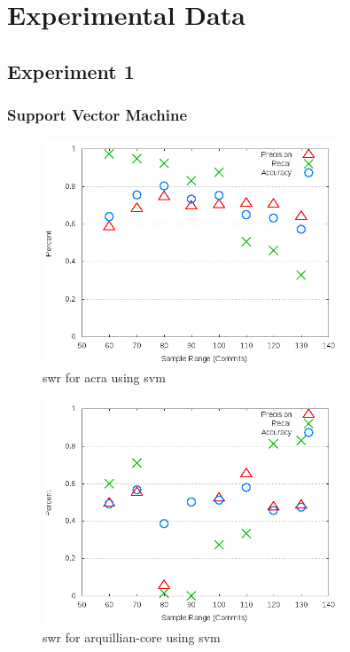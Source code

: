 \appendix
\chapter{Experimental Data}
\label{app:experimental_data}

\section{Experiment 1}
\label{app_sec:experiment_1}

\subsection{Support Vector Machine}
\label{app_sub:experiment_1_svm}

\begin{figure}
\centering
\includegraphics[width=0.8\textwidth]{images/svm/test_1/acra_sample_range.png}
\caption{\gls{swr} for acra using \gls{svm}}
\label{fig:test_1_acra_svm}
\end{figure}

\begin{figure}
\centering
\includegraphics[width=0.8\textwidth]{images/svm/test_1/arquillian-core_sample_range.png}
\caption{\gls{swr} for arquillian-core using \gls{svm}}
\label{fig:test_1_arquillian-core_svm}
\end{figure}

